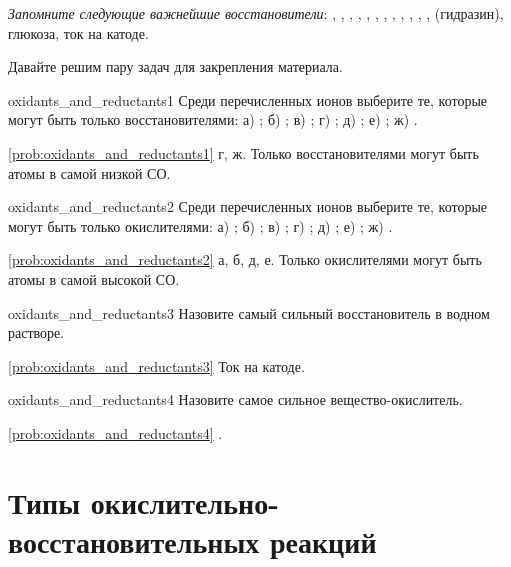 \textit{Запомните следующие важнейшие восстановители}: , , , , , , , , , , , ,  (гидразин), глюкоза, ток на катоде.

Давайте решим пару задач для закрепления материала.

\begin{problem}{}{oxidants_and_reductants1}
    Среди перечисленных ионов выберите те, которые могут быть только восстановителями: а) ; б) ; в) ; г) ; д) ; е) ; ж) .
    \begin{sol}{\ref{prob:oxidants_and_reductants1}}
        г, ж. Только восстановителями могут быть атомы в самой низкой СО.
    \end{sol}
\end{problem}

\begin{problem}{}{oxidants_and_reductants2}
    Среди перечисленных ионов выберите те, которые могут быть только окислителями: а) ; б) ; в) ; г) ; д) ; е) ; ж) .
    \begin{sol}{\ref{prob:oxidants_and_reductants2}}
        а, б, д, е. Только окислителями могут быть атомы в самой высокой СО.
    \end{sol}
\end{problem}

\begin{problem}{}{oxidants_and_reductants3}
    Назовите самый сильный восстановитель в водном растворе.
    \begin{sol}{\ref{prob:oxidants_and_reductants3}}
        Ток на катоде.
    \end{sol}
\end{problem}

\begin{problem}{}{oxidants_and_reductants4}
    Назовите самое сильное вещество-окислитель.
    \begin{sol}{\ref{prob:oxidants_and_reductants4}}
        .
    \end{sol}
\end{problem}

\clearpage

\section{Типы окислительно-восстановительных реакций}

